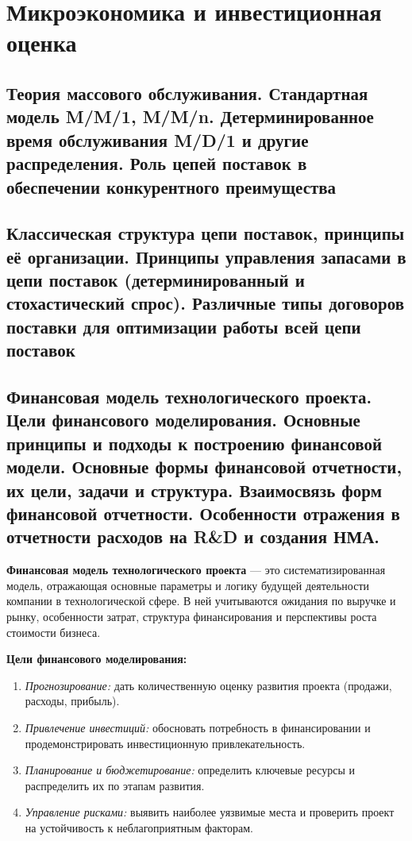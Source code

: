 \section{Микроэкономика и инвестиционная оценка}

\subsection{Теория массового обслуживания. Стандартная модель M/M/1, M/M/n. Детерминированное время обслуживания M/D/1 и другие распределения. Роль цепей поставок в обеспечении конкурентного преимущества}



\subsection{Классическая структура цепи поставок, принципы её организации. Принципы управления запасами в цепи поставок (детерминированный и стохастический спрос). Различные типы договоров поставки для оптимизации работы всей цепи поставок}


\subsection{Финансовая модель технологического проекта. Цели финансового моделирования. Основные принципы и подходы к построению финансовой модели. Основные формы финансовой отчетности, их цели, задачи и структура. Взаимосвязь форм финансовой отчетности. Особенности отражения в отчетности расходов на R\&D и создания НМА.}

\textbf{Финансовая модель технологического проекта} --- это систематизированная модель, отражающая основные параметры и логику будущей деятельности компании в технологической сфере. В ней учитываются ожидания по выручке и рынку, особенности затрат, структура финансирования и перспективы роста стоимости бизнеса.

\textbf{Цели финансового моделирования:}
\begin{enumerate}
    \item \textit{Прогнозирование:} дать количественную оценку развития проекта (продажи, расходы, прибыль).
    \item \textit{Привлечение инвестиций:} обосновать потребность в финансировании и продемонстрировать инвестиционную привлекательность.
    \item \textit{Планирование и бюджетирование:} определить ключевые ресурсы и распределить их по этапам развития.
    \item \textit{Управление рисками:} выявить наиболее уязвимые места и проверить проект на устойчивость к неблагоприятным факторам.
\end{enumerate}

